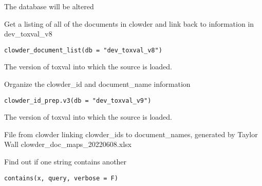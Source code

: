 \documentclass[letterpaper]{book}
\begin{document}
%
\begin{Value}
The database will be altered
\end{Value}
%
\begin{Description}\relax
Get a listing of all of the documents in clowder and link back to information in
dev\_toxval\_v8
\end{Description}
%
\begin{Usage}
\begin{verbatim}
clowder_document_list(db = "dev_toxval_v8")
\end{verbatim}
\end{Usage}
%
\begin{Arguments}
\begin{ldescription}
\item[\code{db}] The version of toxval into which the source is loaded.
\end{ldescription}
\end{Arguments}
%
\begin{Description}\relax
Organize the clowder\_id and document\_name information
\end{Description}
%
\begin{Usage}
\begin{verbatim}
clowder_id_prep.v3(db = "dev_toxval_v9")
\end{verbatim}
\end{Usage}
%
\begin{Arguments}
\begin{ldescription}
\item[\code{db}] The version of toxval into which the source is loaded.

File from clowder linking clowder\_ids to document\_names, generated by Taylor Wall
clowder\_doc\_maps\_20220608.xlsx
\end{ldescription}
\end{Arguments}
%
\begin{Description}\relax
Find out if one string contains another
\end{Description}
%
\begin{Usage}
\begin{verbatim}
contains(x, query, verbose = F)
\end{verbatim}
\end{Usage}
\end{document}
